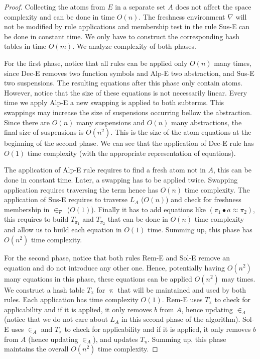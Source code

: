 \documentclass[11pt,a4paper]{amsart}
\theoremstyle{definition}
\newcommand{\permef}{\bullet}
\newcommand\ppi{\uppi}
\begin{document}
\begin{proof}
Collecting the atoms from $E$ in a separate set $A$ does not affect the space complexity and can be done in time $O(n)$. The freshness environment $\nabla$ will not be modified by rule applications and membership test in the rule {\sf Sus-E} can be done in constant time.
We only have to construct the corresponding hash tables in time $O(m)$.
We analyze complexity of both phases. 

For the first phase, notice that all rules can be applied only $O(n)$
many times, since {\sf Dec-E} removes two function symbols and {\sf
  Alp-E} two abstraction, and {\sf Sus-E} two suspensions. The
resulting equations after this phase only contain atoms. However,
notice that the size of these equations is not necessarily linear.
Every time we apply {\sf Alp-E} a new swapping is applied to both
subterms.  This swappings may increase the size of suspensions
occurring bellow the abstraction. Since there are $O(n)$ many
suspensions and $O(n)$ many abstractions, the final size of
suspensions is $O(n^2)$. This is the size of the atom equations at the
beginning of the second phase. We can see that the application of
{\sf Dec-E} rule has $O(1)$ time complexity (with the appropriate
representation of equations). 

The application of {\sf Alp-E} rule requires to find a fresh atom not in $A$, this can be done in constant time. Later, a swapping 
has to be applied twice.
Swapping application requires traversing the term hence has $O(n)$
time complexity. The application of {\sf Sus-E} requires to traverse
$L_A$ ($O(n)$) and check for freshness membership in $\in_\nabla$
($O(1)$). Finally it has to add equations like $(\pi_1\permef a\approx
\pi_2)$, this requires to build $T_{\pi_1}$ and $T_{\pi_2}$ that can
be done in $O(n)$ time complexity and allow us to build each equation
in $O(1)$ time.
Summing up, this phase has $O(n^2)$ time complexity.



For the second phase, notice that both rules {\sf Rem-E} and {\sf
  Sol-E} remove an equation and do not introduce any other one. Hence,
potentially having $O(n^2)$ many equations in this phase, these
equations can be applied $O(n^2)$ may times.  We construct a hash
table $T_\ppi$ for $\ppi$ that will be maintained and used by both
rules. Each application has time complexity $O(1)$.
{\sf Rem-E} uses $T_\ppi$ to check for applicability and if it is
applied, it only removes $b$ from $A$, hence updating $\in_A$ (notice that
we do not care about $L_A$ in this second phase of the algorithm).
{\sf Sol-E} uses $\in_A$ and $T_\ppi$ to check for applicability 
and if it is applied, it only removes $b$ from $A$ (hence updating
$\in_A$), and updates $T_\ppi$.
Summing up, this phase maintains the overall $O(n^2)$ time complexity.%
\end{proof}
\end{document}
